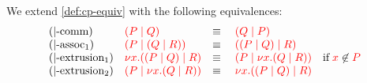 \begin{definition}\label{def:nc-equiv}
  We extend \cref{def:cp-equiv} with the following equivalences:
  \[
    \begin{array}{llll}
      (|\text{-comm})
      & \textcolor{red}{(P \mid Q)}
      & \equiv \;
      & \textcolor{red}{(Q \mid P)}
      \\
      (|\text{-assoc}_1)
      & \textcolor{red}{(P \mid (Q \mid R))}
      & \equiv \;
      & \textcolor{red}{((P \mid Q) \mid R)}
      \\
      ({|}\text{-extrusion}_{1})
      & \textcolor{red}{\nu x.((P \mid Q) \mid R)}
      & \equiv \;
      & \textcolor{red}{(P \mid \nu x.(Q \mid R))} \quad \text{if} \; \textcolor{red}{x}\not\in\textcolor{red}{P} 
      \\
      ({|}\text{-extrusion}_{2})
      & \textcolor{red}{(P \mid \nu x.(Q \mid R))}
      & \equiv \;
      & \textcolor{red}{\nu x.((P \mid Q) \mid R)}
    \end{array}
  \]
\end{definition} 
